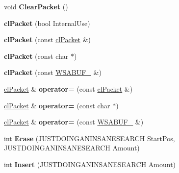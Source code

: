 \begin{DoxyCompactItemize}
\item 
\hypertarget{classcl_packet_a156ff3cef0c09fe258046f2961d43f43}{
void {\bfseries ClearPacket} ()}
\label{classcl_packet_a156ff3cef0c09fe258046f2961d43f43}

\item 
\hypertarget{classcl_packet_ae9d5c7c3fd8b96ebf92d37cc3dec014c}{
{\bfseries clPacket} (bool InternalUse)}
\label{classcl_packet_ae9d5c7c3fd8b96ebf92d37cc3dec014c}

\item 
\hypertarget{classcl_packet_ab9f538a7abe962f6041aa91bf52f9856}{
{\bfseries clPacket} (const \hyperlink{classcl_packet}{clPacket} \&)}
\label{classcl_packet_ab9f538a7abe962f6041aa91bf52f9856}

\item 
\hypertarget{classcl_packet_a629f576a91072fef691f04e433ca1f57}{
{\bfseries clPacket} (const char $\ast$)}
\label{classcl_packet_a629f576a91072fef691f04e433ca1f57}

\item 
\hypertarget{classcl_packet_a1de276a0c6f2bd386592a5659c99489c}{
{\bfseries clPacket} (const \hyperlink{struct_w_s_a_b_u_f__2}{WSABUF\_} \&)}
\label{classcl_packet_a1de276a0c6f2bd386592a5659c99489c}

\item 
\hypertarget{classcl_packet_a7a2f639b3e3adad461e654927645ec48}{
\hyperlink{classcl_packet}{clPacket} \& {\bfseries operator=} (const \hyperlink{classcl_packet}{clPacket} \&)}
\label{classcl_packet_a7a2f639b3e3adad461e654927645ec48}

\item 
\hypertarget{classcl_packet_a39acfe5a158d21e36e728a27eaba730e}{
\hyperlink{classcl_packet}{clPacket} \& {\bfseries operator=} (const char $\ast$)}
\label{classcl_packet_a39acfe5a158d21e36e728a27eaba730e}

\item 
\hypertarget{classcl_packet_a69471d077cd8f785ab36a0d67a8dc627}{
\hyperlink{classcl_packet}{clPacket} \& {\bfseries operator=} (const \hyperlink{struct_w_s_a_b_u_f__2}{WSABUF\_} \&)}
\label{classcl_packet_a69471d077cd8f785ab36a0d67a8dc627}

\item 
\hypertarget{classcl_packet_a8dc066a78d168b765897f8c589e403d9}{
int {\bfseries Erase} (JUSTDOINGANINSANESEARCH StartPos, JUSTDOINGANINSANESEARCH Amount)}
\label{classcl_packet_a8dc066a78d168b765897f8c589e403d9}

\item 
\hypertarget{classcl_packet_ab8864cd14f56c2ae62edb8554a581d5b}{
int {\bfseries Insert} (JUSTDOINGANINSANESEARCH Amount)}
\label{classcl_packet_ab8864cd14f56c2ae62edb8554a581d5b}


\end{DoxyCompactItemize}
